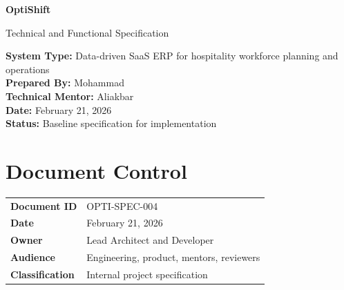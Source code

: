 \documentclass[11pt,a4paper]{article}
\begin{document}
\pagecolor{PageBg}
\color{BodyText}

\hypersetup{pageanchor=false}
\begin{titlepage}
  \centering
  \vspace*{1.8cm}
  {\Huge \textbf{\textcolor{Primary}{OptiShift}} \par}
  \vspace{0.4cm}
  {\Large \textcolor{Accent}{Technical and Functional Specification} \par}
  \vspace{1.3cm}

  \begin{tcolorbox}[colback=SoftBg,colframe=Primary,boxrule=0.7pt,width=0.88\textwidth]
    \textbf{System Type:} Data-driven SaaS ERP for hospitality workforce planning and operations \\
    \textbf{Prepared By:} Mohammad \\
    \textbf{Technical Mentor:} Aliakbar \\
    \textbf{Date:} February 21, 2026 \\
    \textbf{Status:} Baseline specification for implementation
  \end{tcolorbox}
\end{titlepage}
\hypersetup{pageanchor=true}

\tableofcontents
\newpage
{}

\section{Document Control}
\begin{tabularx}{\textwidth}{>{\bfseries}P{0.24\textwidth}Y}
Document ID & OPTI-SPEC-004 \\
Date & February 21, 2026 \\
Owner & Lead Architect and Developer \\
Audience & Engineering, product, mentors, reviewers \\
Classification & Internal project specification \\
\end{tabularx}
\end{document}
